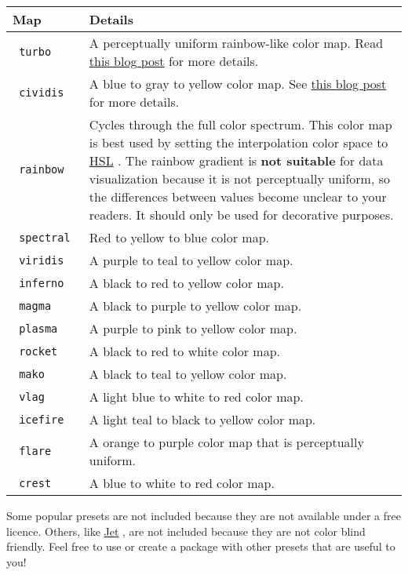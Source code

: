 \begin{longtable}[]{@{}ll@{}}
\toprule\noalign{}
Map & Details \\
\midrule\noalign{}
\endhead
\bottomrule\noalign{}
\endlastfoot
\texttt{\ turbo\ } & A perceptually uniform rainbow-like color map. Read
\href{https://ai.googleblog.com/2019/08/turbo-improved-rainbow-colormap-for.html}{this
blog post} for more details. \\
\texttt{\ cividis\ } & A blue to gray to yellow color map. See
\href{https://bids.github.io/colormap/}{this blog post} for more
details. \\
\texttt{\ rainbow\ } & Cycles through the full color spectrum. This
color map is best used by setting the interpolation color space to
\href{/docs/reference/visualize/color/\#definitions-hsl}{HSL} . The
rainbow gradient is \textbf{not suitable} for data visualization because
it is not perceptually uniform, so the differences between values become
unclear to your readers. It should only be used for decorative
purposes. \\
\texttt{\ spectral\ } & Red to yellow to blue color map. \\
\texttt{\ viridis\ } & A purple to teal to yellow color map. \\
\texttt{\ inferno\ } & A black to red to yellow color map. \\
\texttt{\ magma\ } & A black to purple to yellow color map. \\
\texttt{\ plasma\ } & A purple to pink to yellow color map. \\
\texttt{\ rocket\ } & A black to red to white color map. \\
\texttt{\ mako\ } & A black to teal to yellow color map. \\
\texttt{\ vlag\ } & A light blue to white to red color map. \\
\texttt{\ icefire\ } & A light teal to black to yellow color map. \\
\texttt{\ flare\ } & A orange to purple color map that is perceptually
uniform. \\
\texttt{\ crest\ } & A blue to white to red color map. \\
\end{longtable}

Some popular presets are not included because they are not available
under a free licence. Others, like
\href{https://jakevdp.github.io/blog/2014/10/16/how-bad-is-your-colormap/}{Jet}
, are not included because they are not color blind friendly. Feel free
to use or create a package with other presets that are useful to you!

